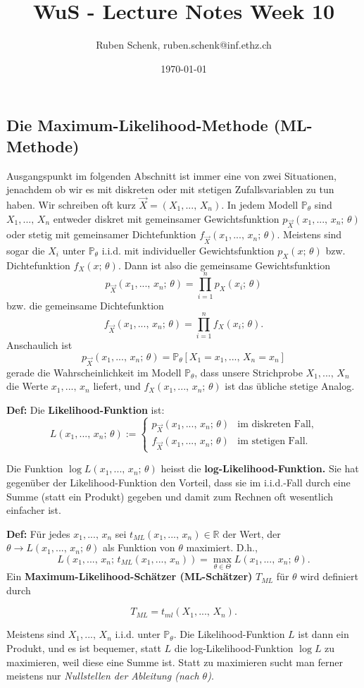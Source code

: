 \documentclass[a4paper]{extarticle}
\title{WuS - Lecture Notes Week 10}
\author{Ruben Schenk, ruben.schenk@inf.ethz.ch}
\date{\today}
\begin{document}
\maketitle

\subsection{Die Maximum-Likelihood-Methode (ML-Methode)}

Ausgangspunkt im folgenden Abschnitt ist immer eine von zwei Situationen, jenachdem ob wir es mit diskreten oder mit stetigen Zufallsvariablen zu tun haben. Wir schreiben oft kurz $\vec{X} = (X_1,..., \, X_n)$. In jedem Modell $\mathbb{P}_{\theta}$ sind $X_1,..., \, X_n$ entweder diskret mit gemeinsamer Gewichtsfunktion $p_{\vec{X}}(x_1,..., \, x_n; \, \theta)$ oder stetig mit gemeinsamer Dichtefunktion $f_{\vec{X}}(x_1,..., \, x_n; \, \theta)$. Meistens sind sogar die $X_i$ unter $\mathbb{P}_{\theta}$ i.i.d. mit individueller Gewichtsfunktion $p_X(x; \, \theta)$ bzw. Dichtefunktion $f_X(x; \, \theta)$. Dann ist also die gemeinsame Gewichtsfunktion
\[
    p_{\vec{X}}(x_1,..., \, x_n; \, \theta) = \prod_{i = 1}^n p_X(x_i; \, \theta)
\]
bzw. die gemeinsame Dichtefunktion
\[
    f_{\vec{X}}(x_1,..., \, x_n; \, \theta) = \prod_{i = 1}^n f_X(x_i; \, \theta).
\]
Anschaulich ist
\[
    p_{\vec{X}}(x_1,..., \, x_n; \, \theta) = \mathbb{P}_{\theta}[X_1 = x_1,..., \, X_n = x_n]
\]
gerade die Wahrscheinlichkeit im Modell $\mathbb{P}_{\theta}$, dass unsere Strichprobe $X_1,..., \, X_n$ die Werte $x_1,..., \, x_n$ liefert, und $f_X(x_1,..., \, x_n; \, \theta)$ ist das übliche stetige Analog.

\textbf{Def:} Die \textbf{Likelihood-Funktion} ist:
\[ L(x_1,..., \, x_n; \, \theta) :=
    \begin{cases}
        p_{\vec{X}}(x_1,..., \, x_n; \, \theta) &\text{im diskreten Fall,}\\
        f_{\vec{X}}(x_1,..., \, x_n; \, \theta) &\text{im stetigen Fall.}
    \end{cases}
\]

Die Funktion $\log L(x_1,..., \, x_n; \, \theta)$ heisst die \textbf{log-Likelihood-Funktion.} Sie hat gegenüber der Likelihood-Funktion den Vorteil, dass sie im i.i.d.-Fall durch eine Summe (statt ein Produkt) gegeben und damit zum Rechnen oft wesentlich einfacher ist.

\textbf{Def:} Für jedes $x_1,..., \, x_n$ sei $t_{ML}(x_1,..., \, x_n) \in \mathbb{R}$ der Wert, der $\theta \to L(x_1,..., \, x_n; \, \theta)$ als Funktion von $\theta$ maximiert. D.h.,
\[
    L(x_1,..., \, x_n; \, t_{ML}(x_1,..., \, x_n)) = \max_{\theta \in \Theta} L(x_1,..., \, x_n; \, \theta).
\]
Ein \textbf{Maximum-Likelihood-Schätzer (ML-Schätzer)} $T_{ML}$ für $\theta$ wird definiert durch

\[
    T_{ML} = t_{ml}(X_1,..., \, X_n).
\]

Meistens sind $X_1,..., \, X_n$ i.i.d. unter $\mathbb{P}_{\theta}$. Die Likelihood-Funktion $L$ ist dann ein Produkt, und es ist bequemer, statt $L$ die log-Likelihood-Funktion $\log L$ zu maximieren, weil diese eine Summe ist. Statt zu maximieren sucht man ferner meistens nur \textit{Nullstellen der Ableitung (nach $\theta$)}.
\end{document}
